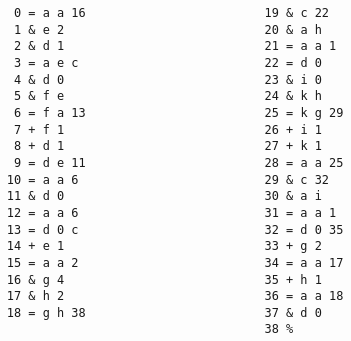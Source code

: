 \documentclass[
aip,
cha,
amssymb
]{revtex4-1}
\begin{document}
\begin{verbatim}
                   0 = a a 16                         19 & c 22
                   1 & e 2                            20 & a h
                   2 & d 1                            21 = a a 1
                   3 = a e c                          22 = d 0
                   4 & d 0                            23 & i 0
                   5 & f e                            24 & k h
                   6 = f a 13                         25 = k g 29
                   7 + f 1                            26 + i 1
                   8 + d 1                            27 + k 1
                   9 = d e 11                         28 = a a 25
                  10 = a a 6                          29 & c 32
                  11 & d 0                            30 & a i
                  12 = a a 6                          31 = a a 1
                  13 = d 0 c                          32 = d 0 35
                  14 + e 1                            33 + g 2
                  15 = a a 2                          34 = a a 17
                  16 & g 4                            35 + h 1
                  17 & h 2                            36 = a a 18
                  18 = g h 38                         37 & d 0
                                                      38 %
\end{verbatim}

\end{document}
